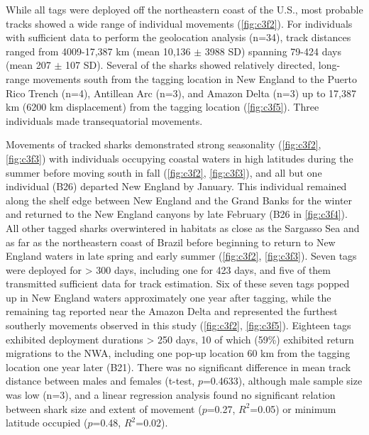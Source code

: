 While all tags were deployed off the northeastern coast of the U.S., most probable tracks showed a wide range of individual movements (\cref{fig:c3f2}). For individuals with sufficient data to perform the geolocation analysis (n=34), track distances ranged from 4009-17,387 km (mean 10,136 $\pm$ 3988 SD) spanning 79-424 days (mean 207 $\pm$ 107 SD). Several of the sharks showed relatively directed, long-range movements south from the tagging location in New England to the Puerto Rico Trench (n=4), Antillean Arc (n=3), and Amazon Delta (n=3) up to 17,387 km (6200 km displacement) from the tagging location (\cref{fig:c3f5}). Three individuals made transequatorial movements.

Movements of tracked sharks demonstrated strong seasonality (\cref{fig:c3f2}, \cref{fig:c3f3}) with individuals occupying coastal waters in high latitudes during the summer before moving south in fall (\cref{fig:c3f2}, \cref{fig:c3f3}), and all but one individual (B26) departed New England by January. This individual remained along the shelf edge between New England and the Grand Banks for the winter and returned to the New England canyons by late February (B26 in \cref{fig:c3f4}). All other tagged sharks overwintered in habitats as close as the Sargasso Sea and as far as the northeastern coast of Brazil before beginning to return to New England waters in late spring and early summer (\cref{fig:c3f2}, \cref{fig:c3f3}). Seven tags were deployed for > 300 days, including one for 423 days, and five of them transmitted sufficient data for track estimation. Six of these seven tags popped up in New England waters approximately one year after tagging, while the remaining tag reported near the Amazon Delta and represented the furthest southerly movements observed in this study (\cref{fig:c3f2}, \cref{fig:c3f5}). Eighteen tags exhibited deployment durations > 250 days, 10 of which (59\%) exhibited return migrations to the NWA, including one pop-up location 60 km from the tagging location one year later (B21). There was no significant difference in mean track distance between males and females (t-test, $p$=0.4633), although male sample size was low (n=3), and a linear regression analysis found no significant relation between shark size and extent of movement ($p$=0.27, $R^2$=0.05) or minimum latitude occupied ($p$=0.48, $R^2$=0.02).

